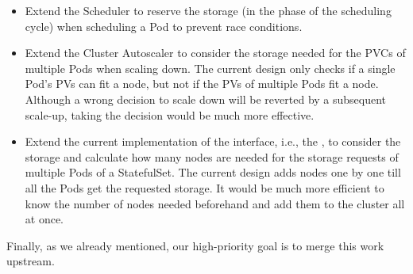 \begin{itemize}
      \item Extend the Scheduler to reserve the storage (in the 
            phase of the scheduling cycle) when scheduling a Pod to prevent race
            conditions.
      \item Extend the Cluster Autoscaler to consider the storage needed for the
            PVCs of multiple Pods when scaling down. The current design only
            checks if a single Pod's PVs can fit a node, but not if the PVs of
            multiple Pods fit a node. Although a wrong decision to scale down
            will be reverted by a subsequent scale-up, taking the decision would
            be much more effective.
      \item Extend the current implementation of the  interface,
            i.e., the , to consider the storage and
            calculate how many nodes are needed for the storage requests of
            multiple Pods of a StatefulSet. The current design adds nodes one by
            one till all the Pods get the requested storage. It would be much
            more efficient to know the number of nodes needed beforehand and add
            them to the cluster all at once.
\end{itemize}

Finally, as we already mentioned, our high-priority goal is to merge this work
upstream.